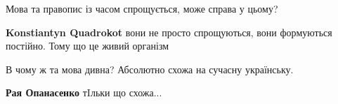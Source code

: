 \begin{itemize}
Мова та правопис із часом спрощується, може справа у цьому?

\begin{itemize}
 
\textbf{Konstiantyn Quadrokot} вони не просто спрощуються, вони формуються постійно. Тому що це живий організм
\end{itemize}

 
В чому ж та мова дивна? Абсолютно схожа на сучасну українську.

\begin{itemize}
 
\textbf{Рая Опанасенко} тIльки що схожа...
\end{itemize}

\end{itemize}

